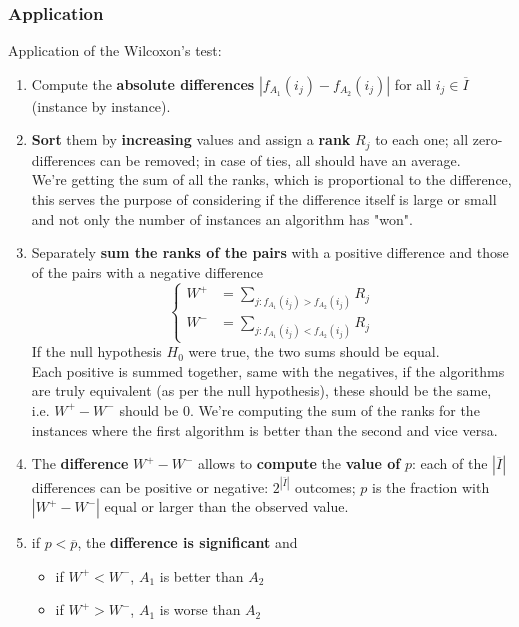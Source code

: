 \documentclass[11pt]{article}
\begin{document}
	\subsubsection{Application}
	Application of the Wilcoxon's test: 
	\begin{enumerate}
		\item Compute the \textbf{absolute differences} $| f_{A_1} (i_j) − f_{A_2} (i_j)|$ for all $i_j \in \overline{I}$ (instance by instance).\\
		
		\item \textbf{Sort} them by \textbf{increasing} values and assign a \textbf{rank} $R_j$ to each one; all zero-differences can be removed; in case of ties, all should have an average.\\
		We're getting the sum of all the ranks, which is proportional to the difference, this serves the purpose of considering if the difference itself is large or small and not only the number of instances an algorithm has "won".\\
		
		\item Separately \textbf{sum the ranks of the pairs} with a positive difference and those of the pairs with a negative difference
		$$ 
		\begin{cases}
			W^+ & = \sum_{j:f_{A_1} (i_j) > f_{A_2} (i_j)} R_j \\
			W^- & = \sum_{j:f_{A_1} (i_j) < f_{A_2} (i_j)} R_j
		\end{cases}
		$$
		If the null hypothesis $H_0$ were true, the two sums should be equal.\\
		Each positive is summed together, same with the negatives, if the algorithms are truly equivalent (as per the null hypothesis), these should be the same, i.e. $W^+ - W^-$ should be $0$. We're computing the sum of the ranks for the instances where the first algorithm is better than the second and vice versa.\\
		
		\item The \textbf{difference} $W^+ - W^-$ allows to \textbf{compute} the \textbf{value of} $p$: each of the $|\overline{I}|$ differences can be positive or negative: $2^{|\overline{I}|}$ outcomes; $p$ is the fraction with $|W^+ - W^-|$ equal or larger than the observed value.\\
		
		\item if $p < \overline{p}$, the \textbf{difference is significant} and
		\begin{itemize}
			\item if $W^+ < W^-$, $A_1$ is better than $A_2$
			\item if $W^+ > W^-$, $A_1$ is worse than $A_2$
		\end{itemize}
	\end{enumerate}
	
\end{document}
